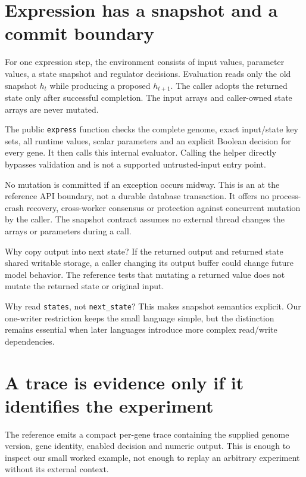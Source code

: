 \section{Expression has a snapshot and a commit boundary}
For one expression step, the environment consists of input values,
parameter values, a state snapshot and regulator decisions. Evaluation
reads only the old snapshot $h_t$ while producing a proposed $h_{t+1}$.
The caller adopts the returned state only after successful completion.
The input arrays and caller-owned state arrays are never mutated.


The public \texttt{express} function checks the complete genome, exact
input/state key sets, all runtime values, scalar parameters and an explicit
Boolean decision for every gene. It then calls this internal evaluator.
Calling the helper directly bypasses validation and is not a supported
untrusted-input entry point.

\begin{center}\end{center}

No mutation is committed if an exception occurs midway. This is an
 at the reference API boundary, not a durable
database transaction. It offers no process-crash recovery, cross-worker
consensus or protection against concurrent mutation by the caller.
The snapshot contract assumes no external thread changes the arrays or
parameters during a call.

Why copy output into next state? If the returned output and returned state
shared writable storage, a caller changing its output buffer could change
future model behavior. The reference tests that mutating a returned value
does not mutate the returned state or original input.

Why read \texttt{states}, not \texttt{next\_state}? This makes snapshot
semantics explicit. Our one-writer restriction keeps the small language
simple, but the distinction remains essential when later languages
introduce more complex read/write dependencies.

\section{A trace is evidence only if it identifies the experiment}
The reference emits a compact per-gene trace containing the supplied genome
version, gene identity, enabled decision and numeric output. This is enough
to inspect our small worked example, not enough to replay an arbitrary
experiment without its external context.

